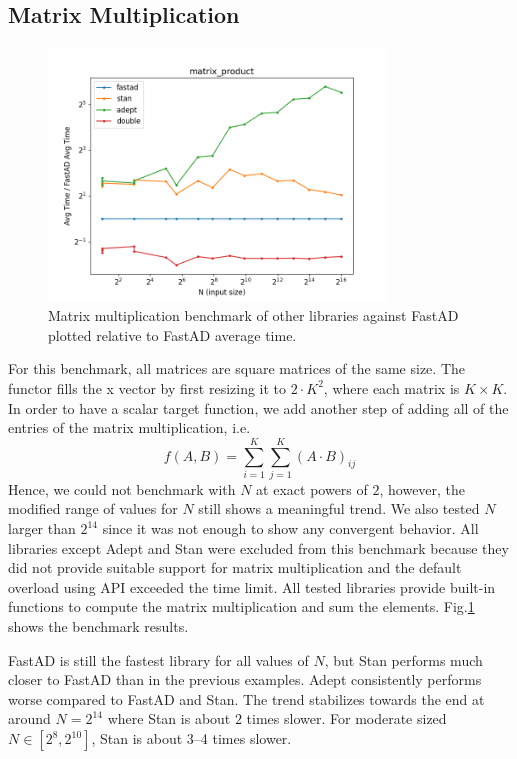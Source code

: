 \subsection{Matrix Multiplication}\label{ssec:matrix_mult}

\begin{figure}[t]
    \centering
    \includegraphics[width=0.8\textwidth]{figs/matrix_product_fig.png}
    \caption{%
        Matrix multiplication benchmark of other libraries against FastAD 
        plotted relative to FastAD average time.
    }\label{fig:matrix_mult}
\end{figure}

For this benchmark, all matrices are square matrices of the same size.
The functor fills the x vector by first resizing it to $2 \cdot K^2$,
where each matrix is $K\times K$.
In order to have a scalar target function,
we add another step of adding all of the entries of the matrix multiplication, i.e.
\[
    f(A, B) = \sum\limits_{i=1}^{K} \sum\limits_{j=1}^{K} {(A \cdot B)}_{ij}
\]
Hence, we could not benchmark with $N$ at exact powers of $ 2$,
however, the modified range of values for $N$ still shows a meaningful trend.
We also tested $N$ larger than $2^{14}$ since it was not enough to show any convergent behavior.
All libraries except Adept and Stan were excluded from this benchmark
because they did not provide suitable support for matrix multiplication
and the default overload using  API exceeded the time limit.
All tested libraries provide built-in functions to 
compute the matrix multiplication and sum the elements.
Fig.\ref{fig:matrix_mult} shows the benchmark results.

FastAD is still the fastest library for all values of $N$, 
but Stan performs much closer to FastAD than in the previous examples.
Adept consistently performs worse compared to FastAD and Stan.
The trend stabilizes towards the end at around $N=2^{14}$ where 
Stan is about $ 2$ times slower.
For moderate sized $N \in [2^{8}, 2^{10}]$, Stan is about 3--4 times slower.

